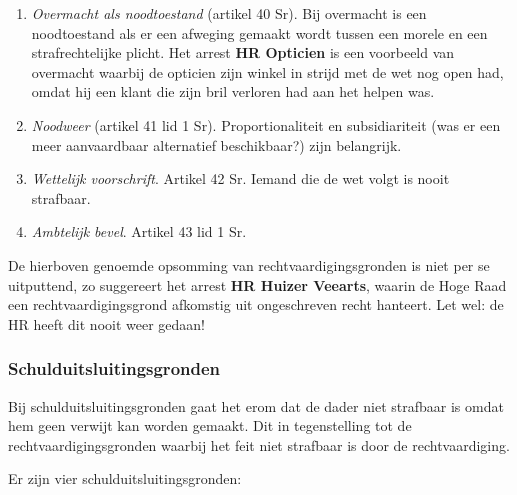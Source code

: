 \documentclass{article}
\begin{document}
\begin{enumerate}
  \item \emph{Overmacht als noodtoestand} (artikel 40 Sr). Bij overmacht is
    een noodtoestand als er een afweging gemaakt wordt tussen een morele en
    een strafrechtelijke plicht. Het arrest \textbf{HR Opticien} is een
    voorbeeld van overmacht waarbij de opticien zijn winkel in strijd met
    de wet nog open had, omdat hij een klant die zijn bril verloren had aan
    het helpen was.

  \item \emph{Noodweer} (artikel 41 lid 1 Sr). Proportionaliteit en
    subsidiariteit (was er een meer aanvaardbaar alternatief beschikbaar?)
    zijn belangrijk.

  \item \emph{Wettelijk voorschrift}. Artikel 42 Sr. Iemand die de wet
    volgt is nooit strafbaar.

  \item \emph{Ambtelijk bevel}. Artikel 43 lid 1 Sr.
\end{enumerate}


De hierboven genoemde opsomming van rechtvaardigingsgronden is niet per se
uitputtend, zo suggereert het arrest \textbf{HR Huizer Veearts}, waarin de
Hoge Raad een rechtvaardigingsgrond afkomstig uit ongeschreven recht
hanteert. Let wel: de HR heeft dit nooit weer gedaan!

\subsubsection{Schulduitsluitingsgronden}

Bij schulduitsluitingsgronden gaat het erom dat de dader niet strafbaar is
omdat hem geen verwijt kan worden gemaakt. Dit in tegenstelling tot de
rechtvaardigingsgronden waarbij het feit niet strafbaar is door de
rechtvaardiging.

Er zijn vier schulduitsluitingsgronden:
\end{document}
